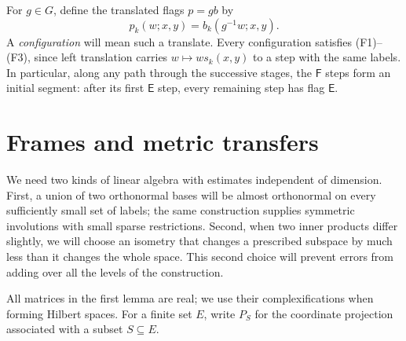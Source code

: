\documentclass[11pt]{article}
\numberwithin{equation}{section}
\theoremstyle{definition}
\theoremstyle{remark}
\newcommand{\E}{\mathsf E}
\newcommand{\F}{\mathsf F}
\begin{document}
For $g\in G$, define the translated flags $p=gb$ by
\[
 p_k(w;x,y)=b_k(g^{-1}w;x,y).
\]
A \emph{configuration} will mean such a translate.  Every
configuration satisfies \textup{(F1)--(F3)}, since left translation
carries $w\longmapsto w s_k(x,y)$ to a step with the same labels.
In particular, along any path through the successive stages, the
$\F$ steps form an initial segment: after its first $\E$ step, every
remaining step has flag $\E$.

\section{Frames and metric transfers}\label{sec:linear}

We need two kinds of linear algebra with estimates independent of dimension.
First, a union of two orthonormal bases will be almost orthonormal on every
sufficiently small set of labels; the same construction supplies symmetric
involutions with small sparse restrictions.  Second, when two inner products differ
slightly, we will choose an isometry that changes a prescribed subspace by
much less than it changes the whole space.  This second choice will prevent
errors from adding over all the levels of the construction.

All matrices in the first lemma are real; we use their complexifications
when forming Hilbert spaces.  For a finite set $E$, write $P_S$ for the
coordinate projection associated with a subset $S\subseteq E$.
\end{document}
